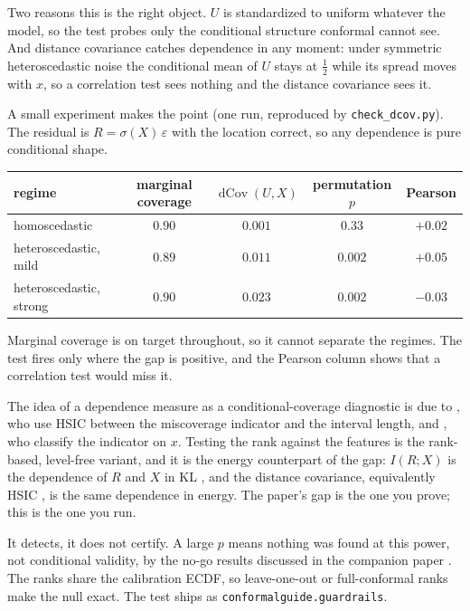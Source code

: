 \documentclass[11pt]{article}
\begin{document}
Two reasons this is the right object. $U$ is standardized to uniform whatever the model, so the
test probes only the conditional structure conformal cannot see. And distance covariance
\citep{szekely2007} catches dependence in any moment: under symmetric heteroscedastic noise the
conditional mean of $U$ stays at $\tfrac12$ while its spread moves with $x$, so a correlation
test sees nothing and the distance covariance sees it.

A small experiment makes the point (one run, reproduced by \texttt{check\_dcov.py}). The
residual is $R=\sigma(X)\,\varepsilon$ with the location correct, so any dependence is pure
conditional shape.

\begin{center}
\begin{tabular}{lcccc}
\hline
regime & marginal coverage & $\operatorname{dCov}(U,X)$ & permutation $p$ & Pearson \\
\hline
homoscedastic & $0.90$ & $0.001$ & $0.33$ & $+0.02$ \\
heteroscedastic, mild & $0.89$ & $0.011$ & $0.002$ & $+0.05$ \\
heteroscedastic, strong & $0.90$ & $0.023$ & $0.002$ & $-0.03$ \\
\hline
\end{tabular}
\end{center}

Marginal coverage is on target throughout, so it cannot separate the regimes. The test fires
only where the gap is positive, and the Pearson column shows that a correlation test would miss
it.

The idea of a dependence measure as a conditional-coverage diagnostic is due to
\citet{feldman2021}, who use HSIC between the miscoverage indicator and the interval length, and
\citet{braun2025}, who classify the indicator on $x$. Testing the rank against the features is
the rank-based, level-free variant, and it is the energy counterpart of the gap: $I(R;X)$ is the
dependence of $R$ and $X$ in KL \citep{cover2006}, and the distance covariance, equivalently
HSIC \citep{sejdinovic2013}, is the same dependence in energy. The paper's gap is the one you
prove; this is the one you run.

It detects, it does not certify. A large $p$ means nothing was found at this power, not
conditional validity, by the no-go results discussed in the companion paper
\citep{cotton_marginally}. The ranks share the calibration ECDF, so leave-one-out or
full-conformal ranks make the null exact. The test ships as \texttt{conformalguide.guardrails}.
\end{document}
